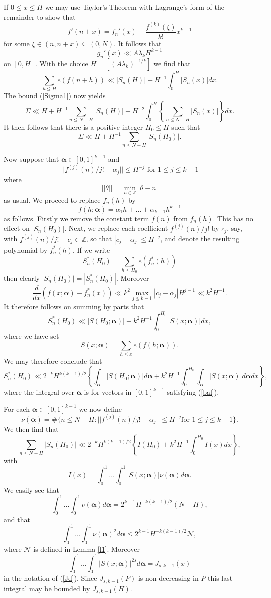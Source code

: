 \documentclass[a4paper,10pt]{article}
\newcommand{\Z}{\mathbb{Z}}
\newcommand{\lk}{\lambda_k}
\newcommand{\bal}{\boldsymbol{\alpha}}
\newcommand{\beql}[1]{\begin{equation}\label{#1}}
\newcommand{\eeq}{\end{equation}}
\begin{document}
If $0\le x\le H$ we may use Taylor's Theorem with Lagrange's form of 
the remainder to show that
\[f'(n+x)=f_n'(x)+\frac{f^{(k)}(\xi)}{k!}x^{k-1}\]
for some $\xi\in(n,n+x)\subseteq(0,N)$. It follows that 
\[g_n'(x)\ll A\lk H^{k-1}\]
on $[0,H]$. With the choice $H=[(A\lk)^{-1/k}]$
we find that 
\[\sum_{h\le H}e(f(n+h))\ll |S_n(H)|+H^{-1}\int_0^H |S_n(x)|dx.\]
The bound (\ref{Sigma1}) now yields
\[\Sigma\ll H+H^{-1}\sum_{n\le N-H}|S_n(H)|+
H^{-2}\int_0^H \left\{\sum_{n\le N-H} |S_n(x)|\right\}dx.\]
It then follows that there is a positive integer $H_0\le H$ such that
\beql{b2}
\Sigma\ll H+H^{-1}\sum_{n\le N-H}|S_n(H_0)|.
\eeq

Now suppose that $\bal\in [0,1]^{k-1}$ and 
\beql{bal}
||f^{(j)}(n)/j!-\alpha_j||\le H^{-j}\mbox{ for } 1\le j\le k-1
\eeq
where 
\[||\theta||=\min_{n\in\Z}|\theta-n|\]
as usual. We proceed to replace $f_n(h)$ by
\[f(h;\bal)=\alpha_1 h+\ldots+\alpha_{k-1}h^{k-1}\]
as follows. Firstly we remove the constant term $f(n)$ from
$f_n(h)$. This has no effect on $|S_n(H_0)|$. Next, we replace each 
coefficient $f^{(j)}(n)/j!$ by $c_j$, say, with
$f^{(j)}(n)/j!-c_j\in\Z$, so that $|c_j-\alpha_j|\le H^{-j}$, and
denote the resulting polynomial by $f^*_n(h)$. If we write
\[S^*_n(H_0)=\sum_{h\le H_0}e(f^*_n(h))\]
then clearly $|S_n(H_0)|=|S^*_n(H_0)|$.  Moreover 
\[\frac{d}{dx}\left(f(x;\bal)-f^*_n(x)\right)\ll k^2\max_{j\le
  k-1}|c_j-\alpha_j|H^{j-1} \ll k^2H^{-1}.\]
It therefore follows on summing by parts that
\[S^*_n(H_0)\ll |S(H_0;\bal)|+k^2 H^{-1}\int_0^{H_0}|S(x;\bal)|dx,\]
where we have set
\[S(x;\bal)=\sum_{h\le x}e(f(h;\bal)).\]
We may therefore conclude that
\[S^*_n(H_0)\ll 2^{-k}H^{k(k-1)/2}\left\{\int_{\bal}|S(H_0;\bal)|
d\bal+k^2 H^{-1}\int_0^{H_0}\int_{\bal}|S(x;\bal)|
d\bal dx\right\},\]
where the integral over $\bal$ is for vectors in $[0,1]^{k-1}$
satisfying (\ref{bal}).

For each $\bal\in [0,1]^{k-1}$ we now define
\[\nu(\bal)=\#\{n\le N-H: ||f^{(j)}(n)/j!-\alpha_j||\le H^{-j}\mbox{
  for } 1\le j\le k-1\}.\]
We then find that
\beql{b1}
\sum_{n\le N-H}|S_n(H_0)|\ll 2^{-k}H^{k(k-1)/2}\left\{I(H_0)+
k^2 H^{-1}\int_0^{H_0}I(x)dx\right\},
\eeq
with
\[I(x)=\int_0^1\ldots\int_0^1|S(x;\bal)|\nu(\bal)
d\bal.\]
We easily see that
\[\int_0^1\ldots\int_0^1\nu(\bal)d\bal=
2^{k-1}H^{-k(k-1)/2}(N-H),\]
and that
\[\int_0^1\ldots\int_0^1\nu(\bal)^2d\bal\le
2^{k-1}H^{-k(k-1)/2}\mathcal{N},\]
where $\mathcal{N}$ is defined in Lemma \ref{l1}.
Moreover
\[\int_0^1\ldots\int_0^1|S(x;\bal)|^{2s}d\bal=J_{s,k-1}(x)\]
in the notation of (\ref{Jd}). Since $J_{s,k-1}(P)$ is non-decreasing
in $P$ this last integral may be bounded by $J_{s,k-1}(H)$.
\end{document}

